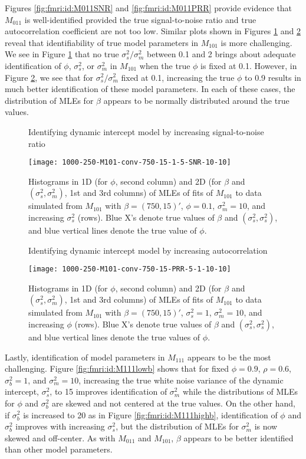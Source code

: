 Figures \ref{fig:fmri:id:M011SNR} and \ref{fig:fmri:id:M011PRR} provide evidence that $M_{011}$ is well-identified provided the true signal-to-noise ratio and true autocorrelation coefficient are not too low. Similar plots shown in Figures \ref{fig:fmri:id:M101SNR} and \ref{fig:fmri:id:M101PRR} reveal that identifiability of true model parameters in $M_{101}$ is more challenging. We see in Figure \ref{fig:fmri:id:M101SNR} that no true $\sigma^2_s / \sigma^2_m$ between 0.1 and 2 brings about adequate identification of $\phi$, $\sigma^2_s$, or $\sigma^2_m$ in $M_{101}$ when the true $\phi$ is fixed at 0.1. However, in Figure \ref{fig:fmri:id:M101PRR}, we see that for $\sigma^2_s / \sigma^2_m$ fixed at 0.1, increasing the true $\phi$ to 0.9 results in much better identification of these model parameters. In each of these cases, the distribution of MLEs for $\beta$ appears to be normally distributed around the true values.

\begin{figure}
\ssp
\centering
\caption{Identifying dynamic intercept model by increasing signal-to-noise ratio} \label{fig:fmri:id:M101SNR}
\texttt{[image: 1000-250-M101-conv-750-15-1-5-SNR-10-10]}
\caption*{Histograms in 1D (for $\phi$, second column) and 2D (for $\beta$ and $(\sigma^2_s,\sigma^2_m)$, 1st and 3rd columns) of MLEs of fits of $M_{101}$ to data simulated from $M_{101}$ with $\beta = (750,15)'$, $\phi = 0.1$, $\sigma^2_m = 10$, and increasing $\sigma^2_s$ (rows). Blue X's denote true values of $\beta$ and $(\sigma^2_s,\sigma^2_s)$, and blue vertical lines denote the true value of $\phi$.}
\end{figure}

\begin{figure}
\ssp
\centering
\caption{Identifying dynamic intercept model by increasing autocorrelation} \label{fig:fmri:id:M101PRR}
\texttt{[image: 1000-250-M101-conv-750-15-PRR-5-1-10-10]}
\caption*{Histograms in 1D (for $\phi$, second column) and 2D (for $\beta$ and $(\sigma^2_s,\sigma^2_m)$, 1st and 3rd columns) of MLEs of fits of $M_{101}$ to data simulated from $M_{101}$ with $\beta = (750,15)'$, $\sigma^2_s = 1$, $\sigma^2_m = 10$, and increasing $\phi$ (rows). Blue X's denote true values of $\beta$ and $(\sigma^2_s,\sigma^2_s)$, and blue vertical lines denote the true values of $\phi$.}
\end{figure}

Lastly, identification of model parameters in $M_{111}$ appears to be the most challenging. Figure \ref{fig:fmri:id:M111lowb} shows that for fixed $\phi = 0.9$, $\rho = 0.6$, $\sigma^2_b = 1$, and $\sigma^2_m = 10$, increasing the true white noise variance of the dynamic intercept, $\sigma^2_s$, to 15 improves identification of $\sigma^2_m$ while the distributions of MLEs for $\phi$ and $\sigma^2_b$ are skewed and not centered at the true values. On the other hand, if $\sigma^2_b$ is increased to 20 as in Figure \ref{fig:fmri:id:M111highb}, identification of $\phi$ and $\sigma^2_b$ improves with increasing $\sigma^2_s$, but the distribution of MLEs for $\sigma^2_m$ is now skewed and off-center. As with $M_{011}$ and $M_{101}$, $\beta$ appears to be better identified than other model parameters.


